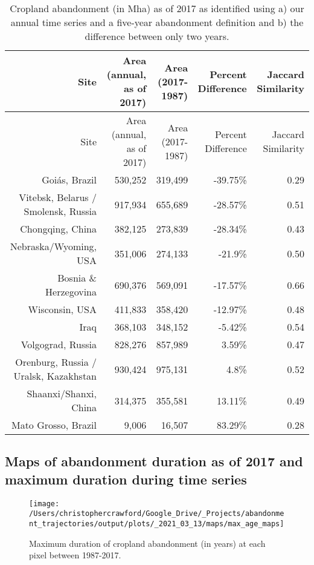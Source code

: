\documentclass[9pt,twocolumn,twoside,lineno]{pnas-new}
\begin{document}
\begin{longtable}[]{@{}rrrrr@{}}
\caption{\label{tab:twoyr-diff-table}Cropland abandonment (in Mha) as of 2017 as identified using a) our annual time series and a five-year abandonment definition and b) the difference between only two years.}\tabularnewline
\toprule
Site & Area (annual, as of 2017) & Area (2017-1987) & Percent Difference & Jaccard Similarity \\
\midrule
\endfirsthead
\toprule
Site & Area (annual, as of 2017) & Area (2017-1987) & Percent Difference & Jaccard Similarity \\
\midrule
\endhead
Goiás, Brazil & 530,252 & 319,499 & -39.75\% & 0.29 \\
Vitebsk, Belarus / Smolensk, Russia & 917,934 & 655,689 & -28.57\% & 0.51 \\
Chongqing, China & 382,125 & 273,839 & -28.34\% & 0.43 \\
Nebraska/Wyoming, USA & 351,006 & 274,133 & -21.9\% & 0.50 \\
Bosnia \& Herzegovina & 690,376 & 569,091 & -17.57\% & 0.66 \\
Wisconsin, USA & 411,833 & 358,420 & -12.97\% & 0.48 \\
Iraq & 368,103 & 348,152 & -5.42\% & 0.54 \\
Volgograd, Russia & 828,276 & 857,989 & 3.59\% & 0.47 \\
Orenburg, Russia / Uralsk, Kazakhstan & 930,424 & 975,131 & 4.8\% & 0.52 \\
Shaanxi/Shanxi, China & 314,375 & 355,581 & 13.11\% & 0.49 \\
Mato Grosso, Brazil & 9,006 & 16,507 & 83.29\% & 0.28 \\
\bottomrule
\end{longtable}

\hypertarget{maps-of-abandonment-duration-as-of-2017-and-maximum-duration-during-time-series}{%
\subsection{Maps of abandonment duration as of 2017 and maximum duration during time series}\label{maps-of-abandonment-duration-as-of-2017-and-maximum-duration-during-time-series}}



\begin{figure}
\texttt{[image: /Users/christophercrawford/Google\_Drive/\_Projects/abandonment\_trajectories/output/plots/\_2021\_03\_13/maps/max\_age\_maps]} \caption{Maximum duration of cropland abandonment (in years) at each pixel between 1987-2017.}\label{fig:map-abn-age-max}
\end{figure}
\end{document}

